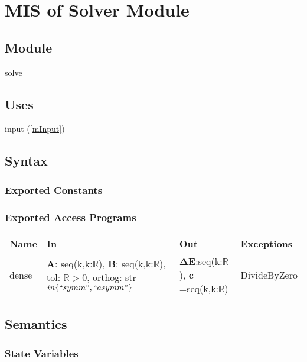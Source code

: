 \documentclass[12pt, titlepage]{article}
\begin{document}
\newpage

\section{MIS of Solver Module} \label{mGEP}

\subsection{Module}

solve

\subsection{Uses}
input (\ref{mInput})

\subsection{Syntax}

\subsubsection{Exported Constants}

\subsubsection{Exported Access Programs}

\begin{center}
	\begin{tabular}{p{2cm} p{4cm} p{4cm} p{2cm}}
		\hline
		\textbf{Name} & \textbf{In} & \textbf{Out} & \textbf{Exceptions} \\
		\hline
		dense & $\textbf{A}$: seq(k,k:$\mathbb{R}$), $\textbf{B}$: 
		seq(k,k:$\mathbb{R}$), 
		tol: $\mathbb{R} >0$, 
		orthog: str $in \{``symm", ``asymm"\}$& 
		$\boldsymbol{\Delta E}$:seq(k:$\mathbb{R}$), 
		$\boldsymbol{c}$=seq(k,k:$\mathbb{R}$) & 
		DivideByZero \\
		\hline
	\end{tabular}
\end{center}

\subsection{Semantics}

\subsubsection{State Variables}
\end{document}
